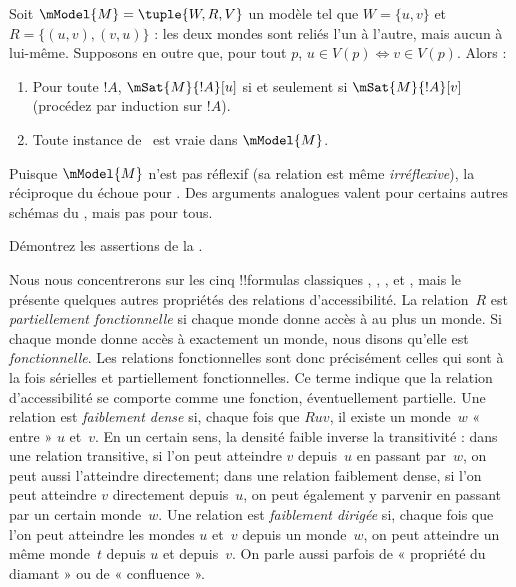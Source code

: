 \documentclass[../../../include/open-logic-section]{subfiles}
\begin{document}
\begin{prop}
  Soit $\mModel{M} = \tuple{W, R, V}$ un modèle tel que
  $W = \{u, v\}$ et $R = \{(u,v),(v,u)\}$ : les deux mondes
  sont reliés l'un à l'autre, mais aucun à lui-même. Supposons
  en outre que, pour tout $p$,
  $u \in V(p) \Leftrightarrow v \in V(p)$. Alors :
  \begin{enumerate}
  \item Pour toute $!A$, $\mSat{M}{!A}[u]$ si et seulement si
    $\mSat{M}{!A}[v]$ (procédez par induction sur $!A$).
  \item Toute instance de~ est vraie dans $\mModel{M}$.
  \end{enumerate}
  Puisque $\mModel{M}$ n'est pas réflexif (sa relation est même
  \emph{irréflexive}), la réciproque du
   échoue pour . Des arguments
  analogues valent pour certains autres schémas du
  , mais pas pour tous.
\end{prop}

\begin{prob}
  Démontrez les assertions de la
  .
\end{prob}

Nous nous concentrerons sur les cinq !!{formula}s classiques
, , ,  et , mais
le  présente quelques autres propriétés des
relations d'accessibilité. La relation~$R$ est
\emph{partiellement fonctionnelle} si chaque monde donne accès
à au plus un monde. Si chaque monde donne accès à exactement
un monde, nous disons qu'elle est \emph{fonctionnelle}.
Les relations fonctionnelles sont donc précisément celles qui
sont à la fois sérielles et partiellement fonctionnelles.
Ce terme indique que la relation d'accessibilité se comporte
comme une fonction, éventuellement partielle. Une relation
est \emph{faiblement dense} si, chaque fois que $Ruv$, il existe
un monde~$w$ « entre » $u$ et~$v$. En un certain sens, la
densité faible inverse la transitivité : dans une relation
transitive, si l'on peut atteindre $v$ depuis~$u$ en passant
par~$w$, on peut aussi l'atteindre directement; dans une
relation faiblement dense, si l'on peut atteindre $v$
directement depuis~$u$, on peut également y parvenir en passant
par un certain monde~$w$. Une relation est
\emph{faiblement dirigée} si, chaque fois que l'on peut
atteindre les mondes $u$ et~$v$ depuis un monde~$w$, on peut
atteindre un même monde~$t$ depuis $u$ et depuis~$v$.
On parle aussi parfois de « propriété du diamant » ou de
« confluence ».
\end{document}
